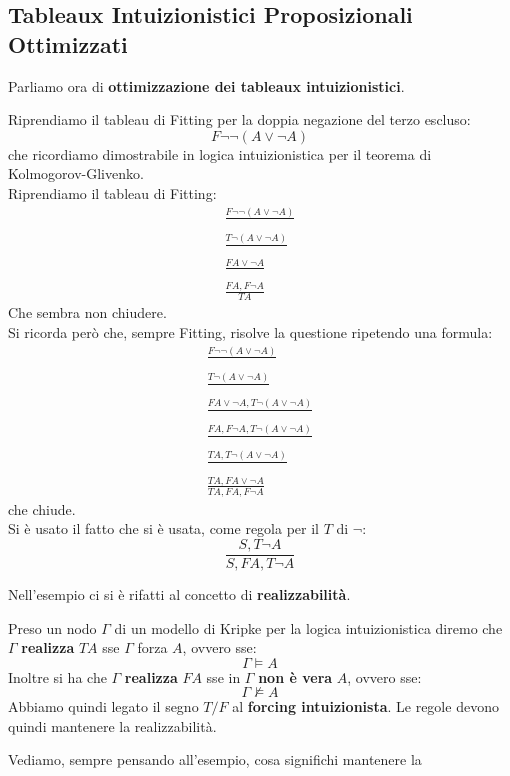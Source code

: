 \documentclass[a4paper,12pt, oneside]{book}
\begin{document}
\subsection{Tableaux Intuizionistici Proposizionali Ottimizzati}
Parliamo ora di \textbf{ottimizzazione dei tableaux intuizionistici}.
\begin{esempio}
  Riprendiamo il tableau di Fitting per la doppia negazione del terzo escluso:
  \[F\neg \neg (A\lor \neg A)\]
  che ricordiamo dimostrabile in logica intuizionistica per il teorema di
  Kolmogorov-Glivenko. \\
  Riprendiamo il tableau di Fitting:
  \begin{gather*}
    \frac{F\neg \neg (A\lor \neg A)}{}\\
    \frac{T\neg(A\lor \neg A)}{}\\
    \frac{FA\lor \neg A}{}\\
    \frac{FA,F\neg A}{TA}
  \end{gather*}
  Che sembra non chiudere. \\
  Si ricorda però che, sempre Fitting, risolve la questione ripetendo una
  formula: 
  \begin{gather*}
    \frac{F\neg \neg (A\lor \neg A)}{}\\
    \frac{T\neg(A\lor \neg A)}{}\\
    \frac{FA\lor \neg A, T\neg(A\lor \neg A)}{}\\
    \frac{FA,F\neg A,T\neg(A\lor \neg A)}{}\\
    \frac{TA,T\neg(A\lor \neg A)}{}\\
    \frac{TA, FA\lor \neg A}{TA, FA, F\neg A}
  \end{gather*}
  che chiude.\\
  Si è usato il fatto che si è usata, come regola per il $T$ di $\neg$:
  \[\frac{S, T\neg A}{S, FA, T\neg A}\]
\end{esempio}
Nell'esempio ci si è rifatti al concetto di \textbf{realizzabilità}.
\begin{definizione}
  Preso un nodo $\Gamma$ di un modello di Kripke per la logica intuizionistica
  diremo che $\Gamma$ \textbf{realizza} $TA$ sse $\Gamma$ \textup{forza} $A$,
  ovvero sse: 
  \[\Gamma\vDash A\]
  Inoltre si ha che $\Gamma$ \textbf{realizza} $FA$ sse in $\Gamma$ \textbf{non
    è vera} $A$, ovvero sse:
  \[\Gamma\nvDash A\]
  Abbiamo quindi legato il segno $T/F$ al \textbf{forcing intuizionista}. Le
  regole devono quindi mantenere la realizzabilità.
\end{definizione}
Vediamo, sempre pensando all'esempio, cosa significhi mantenere la
\end{document}
